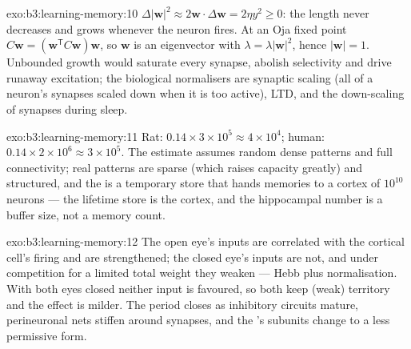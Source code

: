 \begin{solution}{exo:b3:learning-memory:10}
$\Delta|\mathbf{w}|^{2} \approx 2\mathbf{w}\cdot\Delta\mathbf{w} = 2\eta
y^{2} \ge 0$: the length never decreases and grows whenever the neuron
fires. At an Oja fixed point $C\mathbf{w} = (\mathbf{w}^{\mathsf{T}}C
\mathbf{w})\mathbf{w}$, so $\mathbf{w}$ is an eigenvector with $\lambda =
\lambda|\mathbf{w}|^{2}$, hence $|\mathbf{w}| = 1$. Unbounded growth
would saturate every synapse, abolish selectivity and drive runaway
excitation; the biological normalisers are synaptic scaling (all of a
neuron's synapses scaled down when it is too active), LTD, and the
down-scaling of synapses during sleep.
\end{solution}

\begin{solution}{exo:b3:learning-memory:11}
Rat: $0.14\times 3\times 10^{5} \approx 4\times 10^{4}$; human: $0.14
\times 2\times 10^{6} \approx 3\times 10^{5}$. The estimate assumes
random dense patterns and full connectivity; real patterns are sparse
(which raises capacity greatly) and structured, and the  is
a temporary store that hands memories to a cortex of $10^{10}$ neurons
--- the lifetime store is the cortex, and the hippocampal number is a
buffer size, not a memory count.
\end{solution}

\begin{solution}{exo:b3:learning-memory:12}
The open eye's inputs are correlated with the cortical cell's firing
and are strengthened; the closed eye's inputs are not, and under
competition for a limited total weight they weaken --- Hebb plus
normalisation. With both eyes closed neither input is favoured, so
both keep (weak) territory and the effect is milder. The period closes
as inhibitory circuits mature, perineuronal nets stiffen around
synapses, and the 's subunits change to a less permissive
form.
\end{solution}

